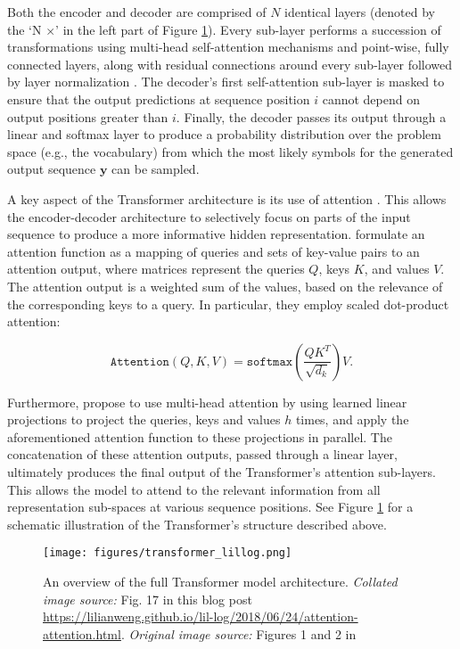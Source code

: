 Both the encoder and decoder are comprised of $N$ identical layers (denoted by the `N $\times$' in the left part of Figure \ref{fig:transformer_architecture}). Every sub-layer performs a succession of transformations using multi-head self-attention mechanisms and point-wise, fully connected layers, along with residual connections \citep{he2016residual} around every sub-layer followed by layer normalization \citep{DBLP:journals/corr/BaKH16}. The decoder's first self-attention sub-layer is masked to ensure that the output predictions at sequence position $i$ cannot depend on output positions greater than $i$. Finally, the decoder passes its output through a linear and softmax layer to produce a probability distribution over the problem space (e.g., the vocabulary) from which the most likely symbols for the generated output sequence $\textbf{y}$ can be sampled.

A key aspect of the Transformer architecture is its use of attention \citep{DBLP:journals/corr/BahdanauCB14}. This allows the encoder-decoder architecture to selectively focus on parts of the input sequence to produce a more informative hidden representation. \cite{vaswani2017attention} formulate an attention function as a mapping of queries and sets of key-value pairs to an attention output, where matrices represent the queries $Q$, keys $K$, and values $V$. The attention output is a weighted sum of the values, based on the relevance of the corresponding keys to a query. In particular, they employ scaled dot-product attention:

\begin{equation}
    \texttt{Attention}(Q, K, V) = \texttt{softmax} \left( \frac{QK^T}{\sqrt{d_k}}\right) V.
\end{equation}

Furthermore, \cite{vaswani2017attention} propose to use multi-head attention by using learned linear projections to project the queries, keys and values $h$ times, and apply the aforementioned attention function to these projections in parallel. The concatenation of these attention outputs, passed through a linear layer, ultimately produces the final output of the Transformer's attention sub-layers. This allows the model to attend to the relevant information from all representation sub-spaces at various sequence positions. See Figure \ref{fig:transformer_architecture} for a schematic illustration of the Transformer's structure described above.


\begin{figure}[H]
    \centering
    \texttt{[image: figures/transformer\_lillog.png]}
    \caption{An overview of the full Transformer model architecture. \textit{Collated image source:} Fig. 17 in this blog post \url{https://lilianweng.github.io/lil-log/2018/06/24/attention-attention.html}. \textit{Original image source:} Figures 1 and 2 in \cite{vaswani2017attention}}
    \label{fig:transformer_architecture}
\end{figure}

